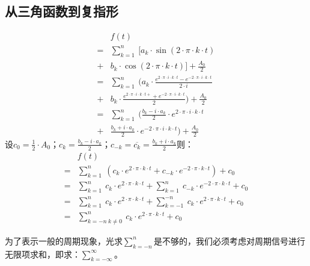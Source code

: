 \subsection{从三角函数到复指形}
\begin{align*}
	  & f(t)                                                                                                                      \\
	= & \sum\limits_{k=1}^n\ [a_k\cdot \sin(2\cdot\pi\cdot k\cdot t)                                                              \\
	+ & b_k\cdot \cos(2\cdot \pi\cdot k\cdot t)]+\frac{A_0}{2}                                                                    \\
	= & \sum\limits_{k=1}^n\ (a_k\cdot \frac{e^{2\cdot \pi\cdot i\cdot k\cdot t}- e^{-2\cdot \pi\cdot i\cdot k\cdot t}}{2\cdot i} \\
	+ & b_k\cdot \frac{e^{2\cdot \pi\cdot i\cdot k\cdot t+}+e^{-2\cdot \pi\cdot i\cdot k\cdot t}}{2})+\frac{A_0}{2}               \\
	= & \sum\limits_{k=1}^n\ (\frac{b_k-i\cdot a_k}{2}\cdot e^{2\cdot \pi\cdot i\cdot k\cdot t}                                   \\
	+ & \frac{b_k+i\cdot a_k}{2}\cdot e^{-2\cdot \pi\cdot i\cdot k\cdot t})+\frac{A_0}{2}
\end{align*}
设$c_0=\frac{1}{2}\cdot A_0$；$c_k=\frac{b_k-i\cdot a_k}{2}$；$c_{-k}=\overline{c_{k}}=\frac{b_k+i\cdot a_k}{2}$则：
\begin{align*}
	  & f(t)                                                                                                                          \\
	= & \sum\limits_{k=1}^n\ (c_k\cdot e^{2\cdot \pi\cdot k\cdot t}+c_{-k}\cdot e^{-2\cdot \pi\cdot k\cdot t})+c_0                    \\
	= & \sum\limits_{k=1}^n\ c_k\cdot e^{2\cdot \pi\cdot k\cdot t}+\sum\limits_{k=1}^n\ c_{-k}\cdot e^{-2\cdot \pi\cdot k\cdot t}+c_0 \\
	= & \sum\limits_{k=1}^n\ c_k\cdot e^{2\cdot \pi\cdot k\cdot t}+\sum\limits_{k=-1}^{-n}\ c_k\cdot e^{2\cdot \pi\cdot k\cdot t}+c_0 \\
	= & \sum\limits_{k=-n\ k\neq0}^n\ c_k\cdot e^{2\cdot \pi\cdot k\cdot t}+c_0
\end{align*}

为了表示一般的周期现象，光求$\sum\limits_{k=-n}^n$是不够的，我们必须考虑对周期信号进行无限项求和，即求：$\sum\limits_{k=-\infty}^\infty$。

